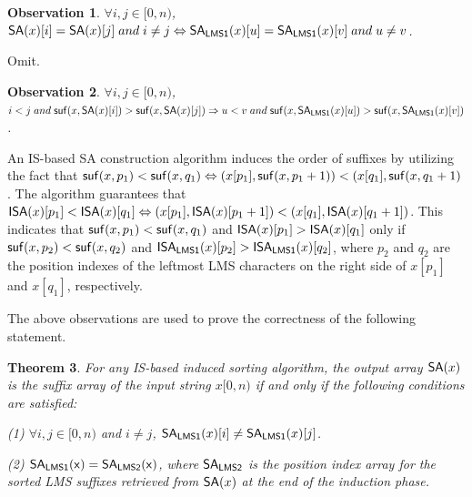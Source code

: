 \documentclass[10pt,journal,compsoc]{IEEEtran}
\newtheorem{theorem}{Theorem}[section]
\newtheorem{observation}[theorem]{Observation}
\begin{document}
\begin{observation} \label{observation:1} $\forall i, j \in [0, n)$, ${\sf SA}(x)[i] = {\sf SA}(x)[j] \; and \; i \ne j \Leftrightarrow {\sf SA_{LMS1}}(x)[u] = {\sf SA_{LMS1}}(x)[v] \; and \; u \ne v$.
\end{observation}

\begin{IEEEproof}
	Omit.
\end{IEEEproof}

\begin{observation} \label{observation:2} $\forall i, j \in [0, n)$, $i < j \; and \; {\sf suf}(x, {\sf SA}(x)[i]) > {\sf suf}(x, {\sf SA}(x)[j]) \Rightarrow u < v \; and \; {\sf suf}(x, {\sf SA_{LMS1}}(x)[u]) > {\sf suf}(x, {\sf SA_{LMS1}}(x)[v])$.
\end{observation}

\begin{IEEEproof} \label{proof:1}
	An IS-based SA construction algorithm induces the order of suffixes by utilizing the fact that ${\sf suf}(x, p_1) < {\sf suf}(x, q_1) \Leftrightarrow (x[p_1], {\sf suf}(x, p_1 + 1)) < (x[q_1], {\sf suf}(x, q_1 + 1)$. The algorithm guarantees that ${\sf ISA}(x)[p_1] < {\sf ISA}(x)[q_1] \Leftrightarrow (x[p_1], {\sf ISA}(x)[p_1 + 1]) < (x[q_1], {\sf ISA}(x)[q_1 + 1])$. This indicates that ${\sf suf}(x,p_1) < {\sf suf}(x, q_1)$ and ${\sf ISA}(x)[p_1] > {\sf ISA}(x)[q_1]$ only if ${\sf suf}(x, p_2) < {\sf suf}(x, q_2)$ and ${\sf ISA_{LMS1}}(x)[p_2] > {\sf ISA_{LMS1}}(x)[q_2]$, where $p_2$ and $q_2$ are the position indexes of the leftmost LMS characters on the right side of $x[p_1]$ and $x[q_1]$, respectively.
\end{IEEEproof}

The above observations are used to prove the correctness of the following statement.

\begin{theorem} \label{theorem:1}
	For any IS-based induced sorting algorithm, the output array ${\sf SA}(x)$ is the suffix array of the input string $x[0, n)$ if and only if the following conditions are satisfied:
	
	(1) $\forall i, j \in [0, n)$ and $i \ne j$, ${\sf SA_{LMS1}}(x)[i] \ne {\sf SA_{LMS1}}(x)[j]$.
	
	(2) ${\sf SA_{LMS1}(x)} = {\sf SA_{LMS2}(x)}$, where ${\sf SA_{LMS2}}$ is the position index array for the sorted LMS suffixes retrieved from ${\sf SA}(x)$ at the end of the induction phase.
\end{theorem}
\end{document}
